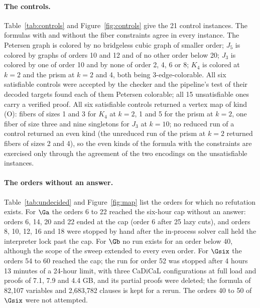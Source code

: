 


\paragraph{The controls.} Table~\ref{tab:controls} and Figure~\ref{fig:controls} give the 21 control instances. The formulas with and without the fiber constraints agree in every instance. The Petersen graph is colored by no bridgeless cubic graph of smaller order; $J_5$ is colored by graphs of orders 10 and 12 and of no other order
below 20; $J_3$ is colored by one of order 10 and by none of order 2, 4, 6 or 8; $K_4$ is colored at $k = 2$ and the prism at $k = 2$ and 4, both being 3-edge-colorable. All six satisfiable controls were accepted by the checker and the pipeline's test of their decoded targets found each of them Petersen colorable; all 15 unsatisfiable ones carry a verified proof. All six satisfiable controls returned a vertex map of kind (O): fibers of sizes 1 and 3 for $K_4$ at $k = 2$, 1 and 5 for the prism at $k = 2$,
one fiber of size three and nine singletons for $J_3$ at $k = 10$; no reduced run of a control returned an even kind (the unreduced run of the prism at $k = 2$ returned fibers of sizes 2 and 4), so the even kinds of the formula with the constraints are exercised only through the agreement of the two encodings on the unsatisfiable instances.



\paragraph{The orders without an answer.} Table~\ref{tab:undecided} and Figure~\ref{fig:map} list the orders for which no refutation exists. For $\Ga$ the orders 6 to 22 reached the six-hour cap without an answer: orders 6, 14, 20 and 22 ended at the cap (order 6 after 25 lazy cuts), and orders 8, 10, 12, 16 and 18 were stopped by hand after the in-process solver call held the interpreter lock past the cap. For $\Gb$ no run exists for an order below 40, although the scope
of the sweep extended to every even order. For $\Gsix$ the orders 54 to 60 reached the cap; the run for order 52 was stopped after 4 hours 13 minutes of a 24-hour limit, with three CaDiCaL configurations at full load and proofs of 7.1, 7.9 and 4.4 GB, and its partial proofs were deleted; the formula of 82{,}107 variables and 2{,}683{,}782 clauses is kept for a rerun. The orders 40 to 50 of $\Gsix$ were not attempted.

